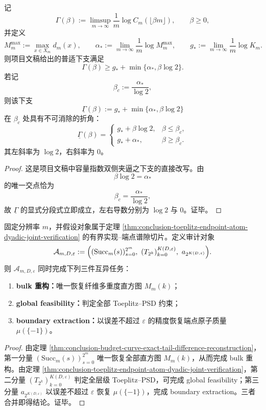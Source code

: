 \begin{proposition}[可逆容量指数的普适折角]\label{prop:conclusion-capacity-exponent-universal-fold-angle}
记
\[
\Gamma(\beta):=
\limsup_{m\to\infty}\frac1m\log C_m(\lfloor \beta m\rfloor),
\qquad
\beta\ge 0,
\]
并定义
\[
M_m^{\max}:=\max_{x\in X_m}d_m(x),
\qquad
\alpha_\ast:=\lim_{m\to\infty}\frac1m\log M_m^{\max},
\qquad
g_\ast:=\lim_{m\to\infty}\frac1m\log K_m.
\]
则项目文稿给出的普适下支满足
\[
\Gamma(\beta)\ge g_\ast+\min\{\alpha_\ast,\beta\log 2\}.
\]
若记
\[
\beta_c:=\frac{\alpha_\ast}{\log 2},
\]
则该下支
\[
\underline\Gamma(\beta):=g_\ast+\min\{\alpha_\ast,\beta\log 2\}
\]
在 \(\beta_c\) 处具有不可消除的折角：
\[
\underline\Gamma(\beta)=
\begin{cases}
g_\ast+\beta\log 2,& \beta\le \beta_c,\\[1mm]
g_\ast+\alpha_\ast,& \beta\ge \beta_c.
\end{cases}
\]
其左斜率为 \(\log 2\)，右斜率为 \(0\)。
\end{proposition}

\begin{proof}
这是项目文稿中容量指数双侧夹逼之下支的直接改写。由
\[
\beta\log 2=\alpha_\ast
\]
的唯一交点恰为
\[
\beta_c=\frac{\alpha_\ast}{\log 2},
\]
故 \(\underline\Gamma\) 的显式分段式立即成立，左右导数分别为 \(\log 2\) 与 \(0\)。证毕。
\end{proof}

\begin{theorem}\label{thm:conclusion-bulk-boundary-joint-finite-complete-audit}
固定分辨率 \(m\)，并假设对象属于定理 \ref{thm:conclusion-toeplitz-endpoint-atom-dyadic-joint-verification} 的有界实现--端点谱隙切片。定义审计对象
\[
\mathcal A_{m,D,\varepsilon}
:=
\Bigl(
(\mathrm{Succ}_m(s))_{s=0}^{2^m},
\ (T_{2^k})_{k=0}^{K(D,\varepsilon)},
\ a_{2^{K(D,\varepsilon)}}
\Bigr).
\]
则 \(\mathcal A_{m,D,\varepsilon}\) 同时完成下列三件互异任务：
\begin{enumerate}
  \item \textbf{bulk 重构：}唯一恢复纤维多重度直方图 \(M_m(k)\)；
  \item \textbf{global feasibility：}判定全部 Toeplitz--PSD 约束；
  \item \textbf{boundary extraction：}以误差不超过 \(\varepsilon\) 的精度恢复端点原子质量 \(\mu(\{-1\})\)。
\end{enumerate}
\end{theorem}

\begin{proof}
由定理 \ref{thm:conclusion-budget-curve-exact-tail-difference-reconstruction}，第一分量 \((\mathrm{Succ}_m(s))_{s=0}^{2^m}\) 唯一恢复全部直方图 \(M_m(k)\)，从而完成 bulk 重构。由定理 \ref{thm:conclusion-toeplitz-endpoint-atom-dyadic-joint-verification}，第二分量 \((T_{2^k})_{k=0}^{K(D,\varepsilon)}\) 判定全层级 Toeplitz--PSD，可完成 global feasibility；第三分量 \(a_{2^{K(D,\varepsilon)}}\) 以误差不超过 \(\varepsilon\) 恢复 \(\mu(\{-1\})\)，完成 boundary extraction。三者合并即得结论。证毕。
\end{proof}

